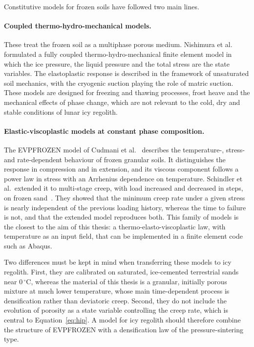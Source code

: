 Constitutive models for frozen soils have followed two main lines.

\paragraph{Coupled thermo-hydro-mechanical models.} These treat the frozen soil as a multiphase porous medium. Nishimura et al.~\cite{nishimura2009} formulated a fully coupled thermo-hydro-mechanical finite element model in which the ice pressure, the liquid pressure and the total stress are the state variables. The elastoplastic response is described in the framework of unsaturated soil mechanics, with the cryogenic suction playing the role of matric suction. These models are designed for freezing and thawing processes, frost heave and the mechanical effects of phase change, which are not relevant to the cold, dry and stable conditions of lunar icy regolith.

\paragraph{Elastic-viscoplastic models at constant phase composition.} The EVPFROZEN model of Cudmani et al.~\cite{cudmani2022} describes the temperature-, stress- and rate-dependent behaviour of frozen granular soils. It distinguishes the response in compression and in extension, and its viscous component follows a power law in stress with an Arrhenius dependence on temperature. Schindler et al.\ extended it to multi-stage creep, with load increased and decreased in steps, on frozen sand~\cite{schindler2024,schindler2025}. They showed that the minimum creep rate under a given stress is nearly independent of the previous loading history, whereas the time to failure is not, and that the extended model reproduces both. This family of models is the closest to the aim of this thesis: a thermo-elasto-viscoplastic law, with temperature as an input field, that can be implemented in a finite element code such as Abaqus.

Two differences must be kept in mind when transferring these models to icy regolith. First, they are calibrated on saturated, ice-cemented terrestrial sands near $0\,^\circ$C, whereas the material of this thesis is a granular, initially porous mixture at much lower temperature, whose main time-dependent process is densification rather than deviatoric creep. Second, they do not include the evolution of porosity as a state variable controlling the creep rate, which is central to Equation~\eqref{eq:hip}. A model for icy regolith should therefore combine the structure of EVPFROZEN with a densification law of the pressure-sintering type.


